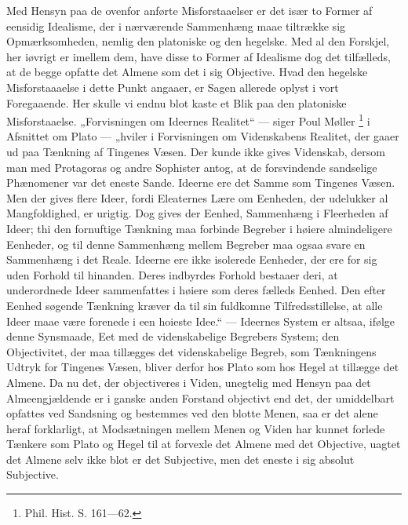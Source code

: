 \documentclass[11pt]{book}
\newcommand{\opage}[1]{\marginnote{\footnotesize\textit{[#1]}}}
\begin{document}
Med Hensyn paa de ovenfor anførte Misforstaaelser er det især to
Former af eensidig Idealisme, der i nærværende Sammenhæng maae
tiltrække sig Opmærksomheden, nemlig den platoniske og den
hegelske. Med al den Forskjel, her iøvrigt er imellem dem, have
disse to Former af Idealisme dog det tilfælleds, at de begge
opfatte det Almene som det i sig Objective. Hvad den hegelske
Misforstaaaelse i dette Punkt
angaaer, er Sagen allerede oplyst i vort Foregaaende. Her skulle vi
endnu blot kaste et Blik paa den platoniske Misforstaaelse.
„Forvisningen om Ideernes Realitet“ --- siger Poul Møller%
\footnote{Phil. Hist. S. 161---62.}
i Afsnittet om Plato --- „hviler i Forvisningen om Videnskabens
Realitet, der gaaer ud paa Tænkning af Tingenes Væsen. Der kunde
ikke gives Videnskab, dersom man med Protagoras og andre Sophister
antog, at de forsvindende sandselige Phænomener var det eneste
Sande. Ideerne ere det Samme som Tingenes Væsen. Men der gives
flere Ideer, fordi Eleaternes Lære om Eenheden, der udelukker al
Mangfoldighed, er urigtig. Dog gives der Eenhed, Sammenhæng i
Fleerheden af Ideer; thi den fornuftige Tænkning maa forbinde
Begreber i høiere almindeligere Eenheder, og til denne Sammenhæng
mellem Begreber maa ogsaa svare en Sammenhæng i det Reale. Ideerne
ere ikke isolerede Eenheder, der ere for sig uden Forhold til
hinanden. Deres indbyrdes Forhold bestaaer deri, at underordnede
Ideer sammenfattes i høiere som deres fælleds Eenhed. Den efter
Eenhed søgende Tænkning kræver da til sin fuldkomne
Tilfredsstillelse, at alle Ideer maae være forenede i een hoieste
Idee.“ --- Ideernes System er altsaa, ifølge denne Synsmaade, Eet
med de videnskabelige Begrebers System; den
\opage{181} \setcounter{footnote}{0}%
Objectivitet, der maa tillægges det videnskabelige Begreb, som
Tænkningens Udtryk for Tingenes Væsen, bliver derfor hos Plato som
hos Hegel at tillægge det Almene. Da nu det, der objectiveres i
Viden, unegtelig med Hensyn paa det Almeengjældende er i ganske
anden Forstand objectivt end det, der umiddelbart opfattes ved
Sandsning og bestemmes ved den blotte Menen, saa er det alene heraf
forklarligt, at Modsætningen mellem Menen og Viden har kunnet
forlede Tænkere som Plato og Hegel til at forvexle det Almene med
det Objective, uagtet det Almene selv ikke blot er det Subjective,
men det eneste i sig absolut Subjective.
\end{document}
